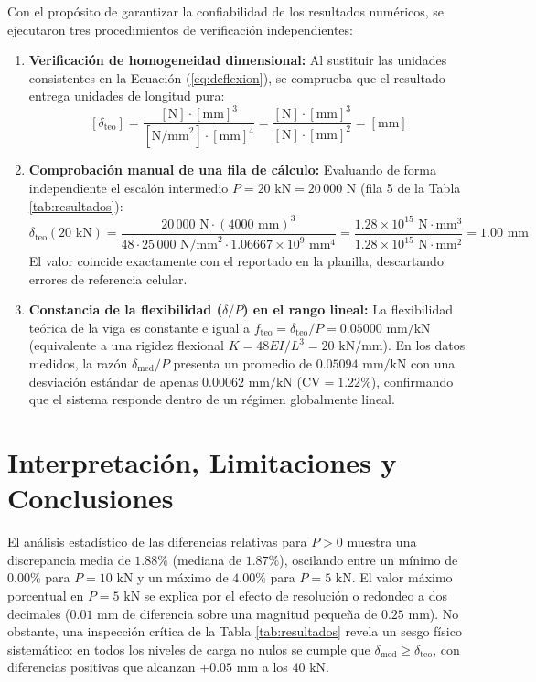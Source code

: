 \documentclass[11pt,a4paper]{article}
\begin{document}
Con el propósito de garantizar la confiabilidad de los resultados numéricos, se ejecutaron tres procedimientos de verificación independientes:
\begin{enumerate}
    \item \textbf{Verificación de homogeneidad dimensional:} Al sustituir las unidades consistentes en la Ecuación (\ref{eq:deflexion}), se comprueba que el resultado entrega unidades de longitud pura:
    \[
        [\delta_{\text{teo}}] = \frac{[\text{N}] \cdot [\text{mm}]^3}{[\text{N/mm}^2] \cdot [\text{mm}]^4} = \frac{[\text{N}] \cdot [\text{mm}]^3}{[\text{N}] \cdot [\text{mm}]^2} = [\text{mm}]
    \]
    \item \textbf{Comprobación manual de una fila de cálculo:} Evaluando de forma independiente el escalón intermedio $P = 20\text{ kN} = 20\,000\text{ N}$ (fila 5 de la Tabla \ref{tab:resultados}):
    \[
        \delta_{\text{teo}}(20\text{ kN}) = \frac{20\,000\text{ N} \cdot (4000\text{ mm})^3}{48 \cdot 25\,000\text{ N/mm}^2 \cdot 1.06667 \times 10^9\text{ mm}^4} = \frac{1.28 \times 10^{15}\text{ N}\cdot\text{mm}^3}{1.28 \times 10^{15}\text{ N}\cdot\text{mm}^2} = 1.00\text{ mm}
    \]
    El valor coincide exactamente con el reportado en la planilla, descartando errores de referencia celular.
    \item \textbf{Constancia de la flexibilidad ($\delta/P$) en el rango lineal:} La flexibilidad teórica de la viga es constante e igual a $f_{\text{teo}} = \delta_{\text{teo}}/P = 0.05000\text{ mm/kN}$ (equivalente a una rigidez flexional $K = 48EI/L^3 = 20\text{ kN/mm}$). En los datos medidos, la razón $\delta_{\text{med}}/P$ presenta un promedio de $0.05094\text{ mm/kN}$ con una desviación estándar de apenas $0.00062\text{ mm/kN}$ ($\text{CV} = 1.22\%$), confirmando que el sistema responde dentro de un régimen globalmente lineal.
\end{enumerate}

\section{Interpretación, Limitaciones y Conclusiones}

El análisis estadístico de las diferencias relativas para $P > 0$ muestra una discrepancia media de $1.88\%$ (mediana de $1.87\%$), oscilando entre un mínimo de $0.00\%$ para $P = 10\text{ kN}$ y un máximo de $4.00\%$ para $P = 5\text{ kN}$. El valor máximo porcentual en $P = 5\text{ kN}$ se explica por el efecto de resolución o redondeo a dos decimales ($0.01\text{ mm}$ de diferencia sobre una magnitud pequeña de $0.25\text{ mm}$). No obstante, una inspección crítica de la Tabla \ref{tab:resultados} revela un sesgo físico sistemático: en todos los niveles de carga no nulos se cumple que $\delta_{\text{med}} \ge \delta_{\text{teo}}$, con diferencias positivas que alcanzan $+0.05\text{ mm}$ a los $40\text{ kN}$.
\end{document}

